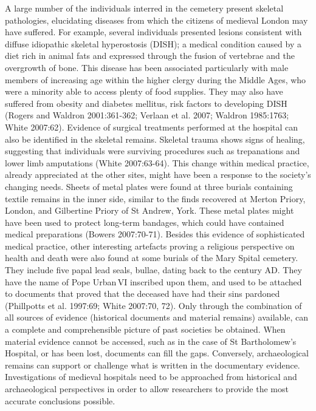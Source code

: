 \documentclass[%
	]{ijsra}
\begin{document}
A large number of the individuals interred in the cemetery present skeletal pathologies, elucidating diseases from which the citizens of medieval London may have suffered. For example, several individuals presented lesions consistent with diffuse idiopathic skeletal hyperostosis (DISH); a medical condition caused by a diet rich in animal fats and expressed through the fusion of vertebrae and the overgrowth of bone. This disease has been associated particularly with male members of increasing age within the higher clergy during the Middle Ages, who were a minority able to access plenty of food supplies. They may also have suffered from obesity and diabetes mellitus, risk factors to developing DISH (Rogers and Waldron 2001:361-362; Verlaan et al. 2007; Waldron 1985:1763; White 2007:62). Evidence of surgical treatments performed at the hospital can also be identified in the skeletal remains. Skeletal trauma shows signs of healing, suggesting that individuals were surviving procedures such as trepanations and lower limb amputations (White 2007:63-64). This change within medical practice, already appreciated at the other sites, might have been a response to the society’s changing needs.
Sheets of metal plates were found at three burials containing textile remains in the inner side, similar to the finds recovered at Merton Priory, London, and Gilbertine Priory of St Andrew, York. These metal plates might have been used to protect long-term bandages, which could have contained medical preparations (Bowers 2007:70-71). 
Besides this evidence of sophisticated medical practice, other interesting artefacts proving a religious perspective on health and death were also found at some burials of the Mary Spital cemetery. They include five papal lead seals, bullae, dating back to the  century AD. They have the name of Pope Urban\,VI inscribed upon them, and used to be attached to documents that proved that the deceased have had their sins pardoned (Phillpotts et al. 1997:69; White 2007:70, 72).
\IJSRAseparator
{}
Only through the combination of all sources of evidence (historical documents and material remains) available, can a complete and comprehensible picture of past societies be obtained. When material evidence cannot be accessed, such as in the case of St Bartholomew’s Hospital, or has been lost, documents can fill the gaps. Conversely, archaeological remains can support or challenge what is written in the documentary evidence. Investigations of medieval hospitals need to be approached from historical and archaeological perspectives in order to allow researchers to provide the most accurate conclusions possible. 
\end{document}

